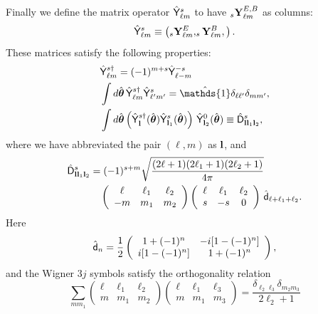 \documentclass[usenatbib]{mnrasb}
\newcommand{\nv}{\hat{\boldsymbol{\theta}}}
\newcommand{\wtj}[6]{\left(\begin{array}{ccc} #1 & #2 & #3\\#4 & #5 & #6\end{array} \right)}
\newcommand{\mI}{{\mathds{1}}}
\begin{document}
      Finally we define the matrix operator $\hat{\sf Y}^s_{\ell m}$ to have $_s{\bf Y}^{E,B}_{\ell m}$ as columns:
      \begin{equation}
        \hat{\sf Y}^s_{\ell m}\equiv\left(_s{\bf Y}^E_{\ell m},_s{\bf Y}^B_{\ell m},\right).
      \end{equation}
      These matrices satisfy the following properties:
      \begin{align}
        &\hat{\sf Y}^{s\dag}_{\ell m}=(-1)^{m+s}\hat{\sf Y}^{-s}_{\ell -m}\\
        &\int d\nv\,\hat{\sf Y}^{s\dag}_{\ell m}\hat{\sf Y}^s_{\ell'm'}=\hat\mI\delta_{\ell\ell'}\delta_{mm'},\\
        &\int d\nv \left(\hat{\sf Y}^{s\dag}_{\bf l}(\nv)\hat{\sf Y}^{s}_{{\bf l}_1}(\nv)\right)\,\hat{\sf Y}^0_{{\bf l}_2}(\nv)\equiv\hat{\sf D}^s_{{\bf l}{\bf l}_1{\bf l}_2},
      \end{align}
      where we have abbreviated the pair $(\ell,m)$ as ${\bf l}$, and
      \begin{align}\label{eq:dmat}
        \hat{\sf D}^s_{{\bf l}{\bf l}_1{\bf l}_2}&=(-1)^{s+m}\sqrt{\frac{(2\ell+1)(2\ell_1+1)(2\ell_2+1)}{4\pi}}\\\nonumber
        &\hspace{10pt}\wtj{\ell}{\ell_1}{\ell_2}{-m}{m_1}{m_2}
        \wtj{\ell}{\ell_1}{\ell_2}{s}{-s}{0}\,\hat{\sf d}_{\ell+\ell_1+\ell_2}.
      \end{align}
      Here
      \begin{equation}
        \hat{\sf d}_n= \frac{1}{2}\left(\begin{array}{cc}
                                            1+(-1)^n & -i[1-(-1)^n]\\
                                            i[1-(-1)^n] & 1+(-1)^n
                                          \end{array}\right),
      \end{equation}
      and the Wigner 3$j$ symbols satisfy the orthogonality relation
      \begin{equation}\label{eq:3jorth}
        \sum_{mm_1}\wtj{\ell}{\ell_1}{\ell_2}{m}{m_1}{m_2}\wtj{\ell}{\ell_1}{\ell_3}{m}{m_1}{m_3}=\frac{\delta_{\ell_2\ell_3}\delta_{m_2m_3}}{2\ell_2+1}
      \end{equation}
\end{document}
